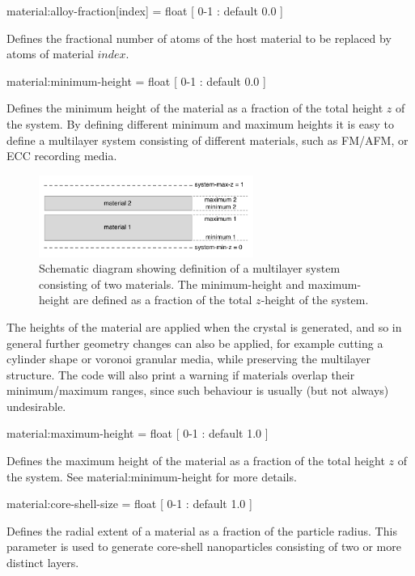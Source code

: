 
{\zicf material:alloy-fraction[index] = float [ 0-1 : default 0.0 ]} Defines the fractional number of atoms of the host material to be replaced by atoms of material $index$.

{\zicf material:minimum-height = float [ 0-1 : default 0.0 ]} Defines the minimum height of the material as a fraction of the total height $z$ of the system. By defining different minimum and maximum heights it is easy to define a multilayer system consisting of different materials, such as FM/AFM, or ECC recording media.

\begin{figure}[!h]
\center
\includegraphics[width=7cm]{figures/multilayers.pdf}
\caption{Schematic diagram showing definition of a multilayer system consisting of two materials. The minimum-height and maximum-height are defined as a fraction of the total $z$-height of the system.}
\label{fig:multilayer}
\end{figure}

The heights of the material are applied when the crystal is generated, and so in general further geometry changes can also be applied, for example cutting a cylinder shape or voronoi granular media, while preserving the multilayer structure. The code will also print a warning if materials overlap their minimum/maximum ranges, since such behaviour is usually (but not always) undesirable.

{\zicf material:maximum-height = float [ 0-1 : default 1.0 ]} Defines the maximum height of the material as a fraction of the total height $z$ of the system. See material:minimum-height for more details.

{\zicf material:core-shell-size = float [ 0-1 : default 1.0 ]} Defines the radial extent of a material as a fraction of the particle radius. This parameter is used to generate core-shell nanoparticles consisting of two or more distinct layers.

